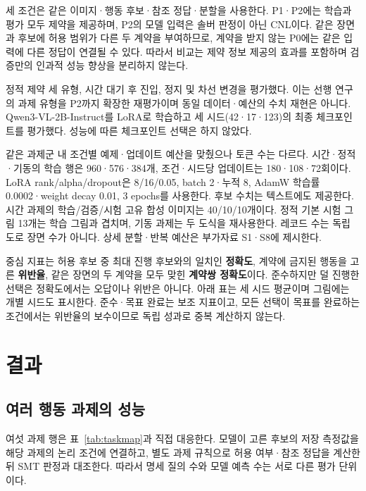 \documentclass[10pt,a4paper,twocolumn]{article}\usepackage[margin=18mm]{geometry}\usepackage{fontspec,kotex}
\begin{document}
세 조건은 같은 이미지·행동 후보·참조 정답·분할을 사용한다. P1·P2에는 학습과 평가 모두 제약을 제공하며, P2의 모델 입력은 솔버 판정이 아닌 CNL이다. 같은 장면과 후보에 허용 범위가 다른 두 계약을 부여하므로, 계약을 받지 않는 P0에는 같은 입력에 다른 정답이 연결될 수 있다. 따라서 비교는 제약 정보 제공의 효과를 포함하며 검증만의 인과적 성능 향상을 분리하지 않는다.\par

정적 제약 세 유형, 시간 대기 후 진입, 정지 및 차선 변경을 평가했다. 이는 선행 연구의 과제 유형을 P2까지 확장한 재평가이며 동일 데이터·예산의 수치 재현은 아니다. Qwen3-VL-2B-Instruct를 LoRA로 학습하고 세 시드(42·17·123)의 최종 체크포인트를 평가했다. 성능에 따른 체크포인트 선택은 하지 않았다.\par

같은 과제군 내 조건별 예제·업데이트 예산을 맞췄으나 토큰 수는 다르다. 시간·정적·기동의 학습 행은 960·576·384개, 조건·시드당 업데이트는 180·108·72회이다. LoRA rank/alpha/dropout은 8/16/0.05, batch 2·누적 8, AdamW 학습률 0.0002·weight decay 0.01, 3 epochs를 사용한다. 후보 수치는 텍스트에도 제공한다. 시간 과제의 학습/검증/시험 고유 합성 이미지는 40/10/10개이다. 정적 기본 시험 그림 13개는 학습 그림과 겹치며, 기동 과제는 두 도식을 재사용한다. 레코드 수는 독립 도로 장면 수가 아니다. 상세 분할·반복 예산은 부가자료 S1·S8에 제시한다.\par

중심 지표는 허용 후보 중 최대 진행 후보와의 일치인 \textbf{정확도}, 계약에 금지된 행동을 고른 \textbf{위반율}, 같은 장면의 두 계약을 모두 맞힌 \textbf{계약쌍 정확도}이다. 준수하지만 덜 진행한 선택은 정확도에서는 오답이나 위반은 아니다. 아래 표는 세 시드 평균이며 그림에는 개별 시드도 표시한다. 준수·목표 완료는 보조 지표이고, 모든 선택이 목표를 완료하는 조건에서는 위반율의 보수이므로 독립 성과로 중복 계산하지 않는다.\par
\section{결과}

\subsection{여러 행동 과제의 성능}

여섯 과제 행은 표~\ref{tab:taskmap}과 직접 대응한다. 모델이 고른 후보의 저장 측정값을 해당 과제의 논리 조건에 연결하고, 별도 과제 규칙으로 허용 여부·참조 정답을 계산한 뒤 SMT 판정과 대조한다. 따라서 명세 질의 수와 모델 예측 수는 서로 다른 평가 단위이다.\par
\end{document}
